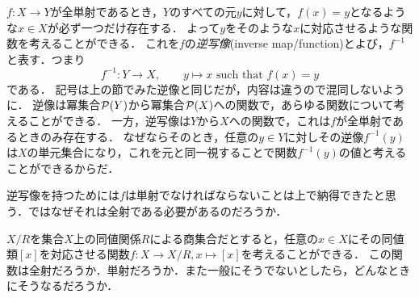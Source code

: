 \documentclass[11pt,a4paper]{bxjsarticle}
\begin{document}
$f:X \to Y$が全単射であるとき，$Y$のすべての元$y$に対して，$f(x)=y$となるような$x \in X$が必ず一つだけ存在する．
よって$y$をそのような$x$に対応させるような関数を考えることができる．
これを$f$の\emph{逆写像}(inverse map/function)とよび，$f^{-1}$と表す．つまり
\[
 f^{-1}:Y \to X, \hspace{2em} y \mapsto x \text{ such that } f(x)=y
\]
である．
記号は上の節でみた逆像と同じだが，内容は違うので混同しないように．
逆像は冪集合$\mathcal{P}(Y)$から冪集合$\mathcal{P}(X)$への関数で，あらゆる関数について考えることができる．
一方，逆写像は$Y$から$X$への関数で，これは$f$が全単射であるときのみ存在する．
なぜならそのとき，任意の$y \in Y$に対しその逆像$f^{-1}(y)$は$X$の単元集合になり，これを元と同一視することで関数$f^{-1}(y)$の値と考えることができるからだ．

\begin{renshu}{}{}
 逆写像を持つためには$f$は単射でなければならないことは上で納得できたと思う．ではなぜそれは全射である必要があるのだろうか．
\end{renshu}

\begin{renshu}{}{}
$X/R$を集合$X$上の同値関係$R$による商集合だとすると，任意の$x \in X$にその同値類$[x]$を対応させる関数$f:X \to X/R, x \mapsto [x]$を考えることができる．
この関数は全射だろうか．単射だろうか．また一般にそうでないとしたら，どんなときにそうなるだろうか．
\end{renshu}



\end{document}
